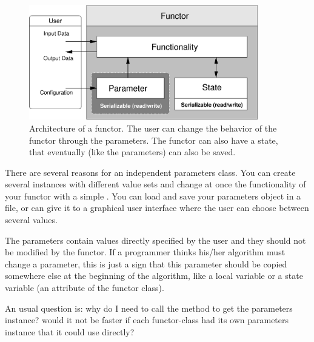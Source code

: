 \begin{figure}[htbp]
  \begin{center}
    \includegraphics[width=10cm]{fig/functor}
    \caption{Architecture of a functor.  The user can change the behavior of
      the functor through the parameters.  The functor can also have a state,
      that eventually (like the parameters) can also be saved.}
    \label{fig:functor}
  \end{center}
\end{figure}


There are several reasons for an independent parameters class.  You can create
several instances with different value sets and change at once the
functionality of your functor with a simple .  You can
load and save your parameters object in a file, or can give it to a graphical
user interface where the user can choose between several values.

The parameters contain values directly specified by the user and they should
not be modified by the functor.  If a programmer thinks his/her
algorithm must change a parameter, this is just a sign that this parameter
should be copied somewhere else at the beginning of the algorithm, like a
local variable or a state variable (an attribute of the functor class).

An usual question is: why do I need to call the method 
to get the parameters instance? would it not be faster if each functor-class
had its own parameters instance that it could use directly?

